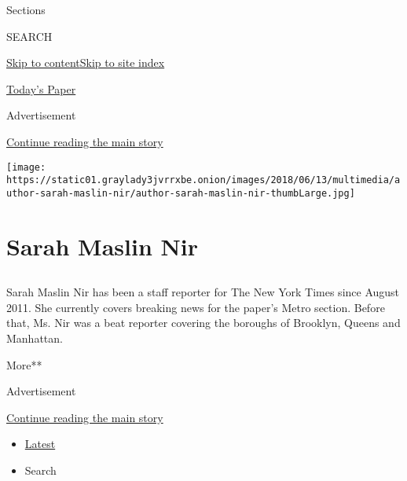 Sections

SEARCH

\protect\hyperlink{site-content}{Skip to
content}\protect\hyperlink{site-index}{Skip to site index}

\href{https://myaccount.nytimes3xbfgragh.onion/auth/login?response_type=cookie\&client_id=vi}{}

\href{https://www.nytimes3xbfgragh.onion/section/todayspaper}{Today's
Paper}

Advertisement

\protect\hyperlink{after-top}{Continue reading the main story}

\texttt{[image: https://static01.graylady3jvrrxbe.onion/images/2018/06/13/multimedia/author-sarah-maslin-nir/author-sarah-maslin-nir-thumbLarge.jpg]}

\hypertarget{sarah-maslin-nir}{%
\section{Sarah Maslin Nir}\label{sarah-maslin-nir}}

\subsection{}

Sarah Maslin Nir has been a staff reporter for The New York Times since
August 2011. She currently covers breaking news for the paper's Metro
section. Before that, Ms. Nir was a beat reporter covering the boroughs
of Brooklyn, Queens and Manhattan.

More**

Advertisement

\protect\hyperlink{after-mid1}{Continue reading the main story}

\begin{itemize}
\tightlist
\item
  \protect\hyperlink{stream-panel}{Latest}
\item
  Search
\end{itemize}

